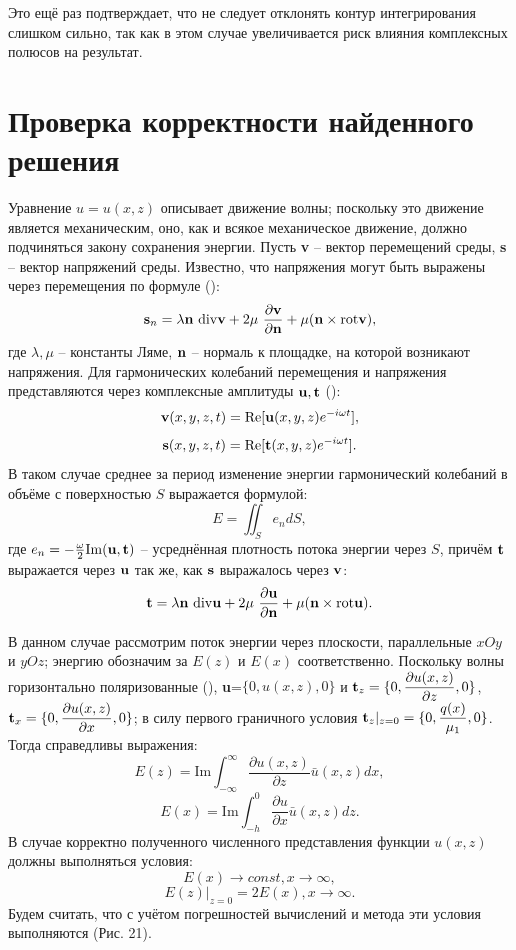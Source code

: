 \documentclass[a4paper, 12pt]{article}
\begin{document}
Это ещё раз подтверждает, что не следует отклонять контур интегрирования слишком сильно, так как в этом случае увеличивается риск влияния комплексных полюсов на результат.

\section{Проверка корректности найденного решения}
Уравнение $u=u(x,z)$ описывает движение волны; поскольку это движение является механическим, оно, как и всякое механическое движение, должно подчиняться закону сохранения энергии.
Пусть {\bf v} -- вектор перемещений среды, {\bf s} -- вектор напряжений среды. Известно, что напряжения могут быть выражены через перемещения по формуле (\cite{g89}):
$${\bf s}_n = \lambda {\bf n}\ \mathrm{div} {\bf v}+ 2\mu\ \dfrac{\partial {\bf v}}{\partial {\bf n}}+\mu ({\bf n} \times \mathrm{rot} {\bf v}),$$
где $\lambda, \mu$ -- константы Ляме, ${\bf n}$ -- нормаль к площадке, на которой возникают напряжения.
Для гармонических колебаний перемещения и напряжения представляются через комплексные амплитуды ${\bf u,\bf t}$ (\cite{g89}):
$${\bf v}(x,y,z,t)=\mathrm{Re} [{\bf u}(x,y,z) e^{-i\omega t}],$$
$${\bf s}(x,y,z,t)=\mathrm{Re} [{\bf t}(x,y,z) e^{-i\omega t}].$$
В таком случае среднее за период изменение энергии гармонический колебаний в объёме с поверхностью $S$ выражается формулой:
$$E=\iint_S e_n dS,$$
где $e_n=-\frac{\omega}{2}\mathrm{Im}({\bf u},{\bf t})$ -- усреднённая плотность потока энергии через $S$, причём $\bf t$ выражается через $\bf u$ так же, как $\bf s$ выражалось через $\bf v$:
$${\bf t} = \lambda {\bf n}\ \mathrm{div} {\bf u}+ 2\mu\ \dfrac{\partial {\bf u}}{\partial {\bf n}}+\mu ({\bf n} \times \mathrm{rot} {\bf u}).$$

В данном случае рассмотрим поток энергии через плоскости, параллельные $x O y$ и $y O z$; энергию обозначим за $E(z)$ и $E(x)$ соответственно. Поскольку волны горизонтально поляризованные (\cite{g89}), {\bf u}=$\{0,u(x,z),0 \}$ и ${\bf t}_z=\{0,\dfrac{\partial u(x,z)}{\partial z},0 \}$, ${\bf t}_x=\{0,\dfrac{\partial u(x,z)}{\partial x},0 \}$;
в силу первого граничного условия ${\bf t}_z|_{z=0}=\{0,\dfrac{q(x)}{\mu_1},0 \}$. Тогда справедливы выражения:
$$E(z)=\mathrm{Im}\int^{\infty}_{-\infty} \dfrac{\partial u(x,z)}{\partial z}  \bar u(x,z) dx,$$
$$E(x)=\mathrm{Im}\int^0_{-h} \dfrac{\partial u}{\partial x} \bar u(x,z) dz.$$ 
В случае корректно полученного численного представления функции $u(x,z)$ должны выполняться условия:
$$E(x) \rightarrow c o n s t, x \rightarrow \infty ,$$
$$E(z)|_{z=0}=2E(x), x \rightarrow \infty .$$
Будем считать, что с учётом погрешностей вычислений и метода эти условия выполняются (Рис. 21).
\end{document}
